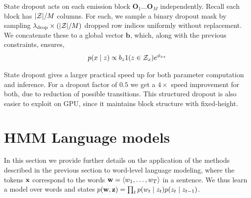 \documentclass[11pt,a4paper]{article}
\begin{document}

State dropout acts on each emission block $\mathbf{O}_1 \ldots \mathbf{O}_M$ independently.
Recall each block has $|{\cal Z}| / M$ columns.
For each, we sample a binary dropout mask by sampling
$ \lambda_{\text{drop}} \times(|{\cal Z}| / M)$ dropped row indices uniformly without replacement.
We concatenate these to a global vector $\mathbf{b}$, which, along with the previous constraints,  ensures,
\begin{equation}
\label{eqn:state_dropout}
p(x \mid z) \propto b_{z}1(z \in \mathcal{Z}_x)e^{\phi_{xz}}
\end{equation}

State dropout gives a larger practical speed up for both parameter computation and inference.
For a dropout factor of $0.5$ we get a $4\times$ speed improvement for both,
due to reduction of possible transitions.
This structured dropout is also easier to exploit on GPU,
since it maintains block structure with fixed-height.










\section{HMM Language models}
\label{sec:experiments}
In this section we provide further details on the application
of the methods described in the previous section
to word-level language modeling,
where the tokens $\mathbf{x}$ correspond to the words
$\mathbf{w} = \langle w_1,\ldots,w_T \rangle$ in a sentence.
We thus learn a model over words and states
$p(\mathbf{w},\mathbf{z}) = \prod_t p(w_t\mid z_t)p(z_t \mid z_{t-1})$.
\end{document}
